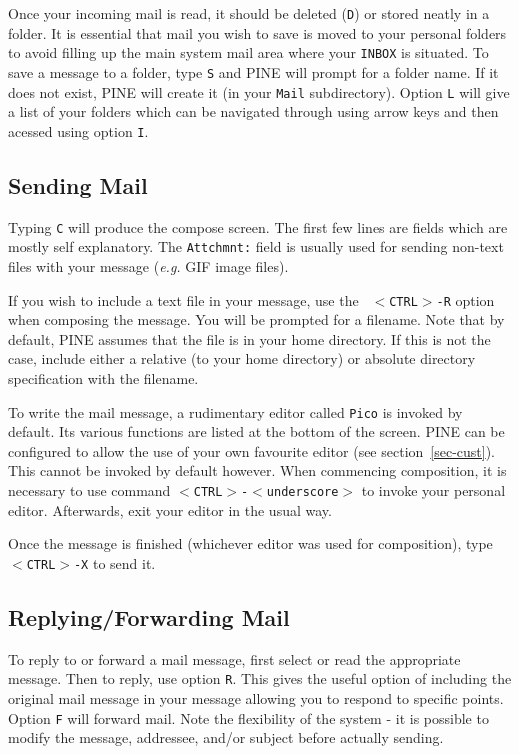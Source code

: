 Once your incoming mail is read, it should be deleted ({\tt D}) or
stored neatly in a folder. It is essential that mail you wish to save
is moved to your personal folders to avoid filling up the main system
mail area where your {\tt INBOX} is situated.  To save a message to a
folder, type {\tt S} and PINE will prompt for a folder name. If it does
not exist, PINE will create it (in your {\tt Mail} subdirectory).
Option {\tt L} will give a list of your folders which can be navigated
through using arrow keys and then acessed using option {\tt I}.

\subsection{Sending Mail}

Typing {\tt C} will produce the compose screen. The first few lines are
fields which are mostly self explanatory. The {\tt Attchmnt:} field is
usually used for sending non-text files with your message ({\em e.g.}
GIF image files).

If you wish to include a text file in your message, use the {\tt
$<$CTRL$>$-R} option when composing the message. You will be prompted
for a filename.  Note that by default, PINE assumes that the file is in
your home directory. If this is not the case, include either a relative
(to your home directory) or absolute directory specification with the
filename.

To write the mail message, a rudimentary editor called {\tt Pico} is
invoked by default.  Its various functions are listed at the bottom of
the screen.  PINE can be configured to allow the use of your own
favourite editor (see section~\ref{sec-cust}). This cannot be invoked
by default however.  When commencing composition, it is necessary to
use command {\tt $<$CTRL$>$-$<$underscore$>$} to invoke your personal
editor.  Afterwards, exit your editor in the usual way.

Once the message is finished (whichever editor was used for composition),
type  {\tt $<$CTRL$>$-X} to send it.

\subsection{Replying/Forwarding Mail}

To reply to or forward a mail message, first select or read the
appropriate message. Then to reply, use option {\tt R}.  This gives the
useful option of including the original mail message in your message
allowing you to respond to specific points. Option {\tt F} will forward
mail. Note the flexibility of the system - it is possible to modify the
message, addressee, and/or subject before actually sending.

